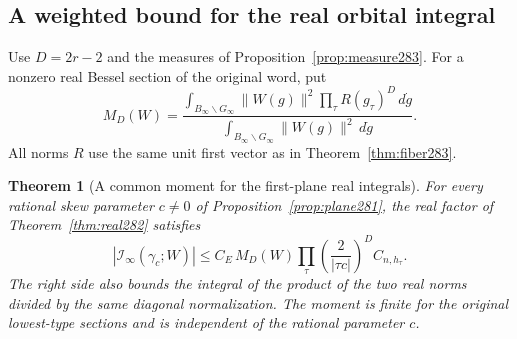 \documentclass[a4paper,11pt]{article}
\newtheorem{theorem}[proposition]{Theorem}
\theoremstyle{definition}
\theoremstyle{remark}
\numberwithin{equation}{section}
\begin{document}
\subsection{A weighted bound for the real orbital integral}\label{nav:V-47}
Use \(D=2r-2\) and the measures of
Proposition~\ref{prop:measure283}. For a nonzero real Bessel
section of the original word, put
\[
 M_D(W)=
 \frac{\int_{B_\infty\backslash G_\infty}\|W(g)\|^2
                 \prod_\tau R(g_\tau)^D\,d\dot g}
      {\int_{B_\infty\backslash G_\infty}\|W(g)\|^2\,d\dot g}.
\]
All norms \(R\) use the same unit first vector as in
Theorem~\ref{thm:fiber283}.

\begin{theorem}[A common moment for the first-plane real integrals]\leavevmode
\label{thm:moment283}
For every rational skew parameter \(c\ne0\) of
Proposition~\ref{prop:plane281}, the real factor of
Theorem~\ref{thm:real282} satisfies
\[
 |\mathcal I_\infty(\gamma_c;W)|
 \le C_E\, M_D(W)
       \prod_\tau \left(\frac{2}{|\tau c|}\right)^D C_{n,h_\tau}.
\]
The right side also bounds the integral of the product of the
two real norms divided by the same diagonal normalization.
The moment is finite for the original lowest-type sections
and is independent of the rational parameter \(c\).
\end{theorem}
\end{document}
